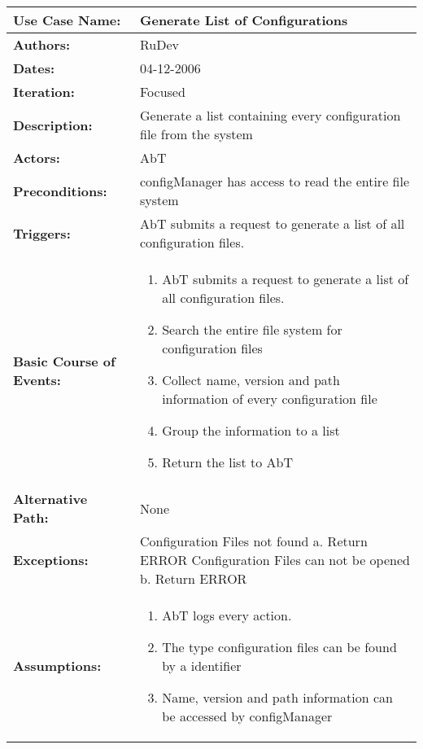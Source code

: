 \begin{tabularx}{\linewidth}{|l|X|}
\hline
\textbf{Use Case Name:} & \textbf{Generate List of Configurations} \\
\hline
\textbf{Authors:} & RuDev \\
\hline
\textbf{Dates:} & 04-12-2006 \\
\hline
\textbf{Iteration:} & Focused \\
\hline
\textbf{Description:} & Generate a list containing every configuration file from the system \\
\hline
\textbf{Actors:} & AbT \\
\hline
\textbf{Preconditions:} & configManager has access to read the entire file system \\
\hline
\textbf{Triggers:} & AbT submits a request to generate a list of all configuration files. \\
\hline
\textbf{Basic Course of Events:} & 
\begin{minipage}{\linewidth} 
  \vspace{0.05em}
  \begin{enumerate}
   \item AbT submits a request to generate a list of all configuration files.
   \item Search the entire file system for configuration files
   \item Collect name, version and path information of every configuration file
   \item Group the information to a list
   \item Return the list to AbT
  \end{enumerate}
  \vspace{0.05em}
\end{minipage}
\\
\hline 
\textbf{Alternative Path:} & None \\
\hline
\textbf{Exceptions:} & Configuration Files not found \newline a. Return ERROR \newline \newline Configuration Files can not be opened \newline b. Return ERROR \\
\hline
\textbf{Assumptions:} & \begin{enumerate} 
							\item AbT logs every action.
							\item The type configuration files can be found by a identifier
							\item Name, version and path information can be accessed by configManager

\end{enumerate}
\end{tabularx}
